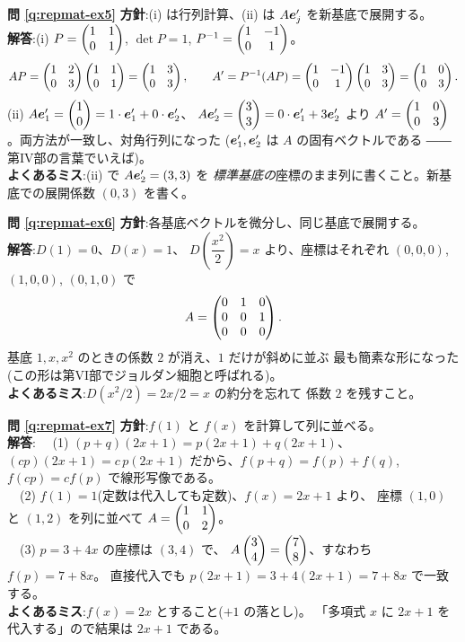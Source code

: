 \bigskip
\noindent\textbf{問 \ref{q:repmat-ex5}}\quad
\textbf{方針}:(i) は行列計算、(ii) は $A\bm{e}'_j$ を新基底で展開する。\\
\textbf{解答}:(i) $P = \begin{pmatrix}1 & 1 \\ 0 & 1\end{pmatrix}$, $\det P = 1$,
$P^{-1} = \begin{pmatrix}1 & -1 \\ 0 & 1\end{pmatrix}$。
\[
AP = \begin{pmatrix}1 & 2 \\ 0 & 3\end{pmatrix}\begin{pmatrix}1 & 1 \\ 0 & 1\end{pmatrix} = \begin{pmatrix}1 & 3 \\ 0 & 3\end{pmatrix},
\qquad
A' = P^{-1}(AP) = \begin{pmatrix}1 & -1 \\ 0 & 1\end{pmatrix}\begin{pmatrix}1 & 3 \\ 0 & 3\end{pmatrix}
= \begin{pmatrix}1 & 0 \\ 0 & 3\end{pmatrix}.
\]
(ii) $A\bm{e}'_1 = \begin{pmatrix}1 \\ 0\end{pmatrix} = 1 \cdot \bm{e}'_1 + 0 \cdot \bm{e}'_2$、
$A\bm{e}'_2 = \begin{pmatrix}3 \\ 3\end{pmatrix} = 0 \cdot \bm{e}'_1 + 3\bm{e}'_2$ より
$A' = \begin{pmatrix}1 & 0 \\ 0 & 3\end{pmatrix}$。両方法が一致し、対角行列になった
($\bm{e}'_1, \bm{e}'_2$ は $A$ の固有ベクトルである
――第IV部の言葉でいえば)。\\
\textbf{よくあるミス}:(ii) で $A\bm{e}'_2 = (3, 3)$ を
\emph{標準基底の}座標のまま列に書くこと。新基底での展開係数
$(0, 3)$ を書く。

\bigskip
\noindent\textbf{問 \ref{q:repmat-ex6}}\quad
\textbf{方針}:各基底ベクトルを微分し、同じ基底で展開する。\\
\textbf{解答}:$D(1) = 0$、$D(x) = 1$、
$D\!\left(\dfrac{x^2}{2}\right) = x$ より、座標はそれぞれ
$(0,0,0)$, $(1,0,0)$, $(0,1,0)$ で
\[
A = \begin{pmatrix}0 & 1 & 0 \\ 0 & 0 & 1 \\ 0 & 0 & 0\end{pmatrix}.
\]
基底 $1, x, x^2$ のときの係数 $2$ が消え、$1$ だけが斜めに並ぶ
最も簡素な形になった(この形は第VI部でジョルダン細胞と呼ばれる)。\\
\textbf{よくあるミス}:$D(x^2/2) = 2x/2 = x$ の約分を忘れて
係数 $2$ を残すこと。

\bigskip
\noindent\textbf{問 \ref{q:repmat-ex7}}\quad
\textbf{方針}:$f(1)$ と $f(x)$ を計算して列に並べる。\\
\textbf{解答}:
　(1) $(p + q)(2x + 1) = p(2x + 1) + q(2x + 1)$、
$(cp)(2x + 1) = c\,p(2x + 1)$ だから、$f(p + q) = f(p) + f(q)$,
$f(cp) = c f(p)$ で線形写像である。\\
　(2) $f(1) = 1$(定数は代入しても定数)、$f(x) = 2x + 1$ より、
座標 $(1, 0)$ と $(1, 2)$ を列に並べて
$A = \begin{pmatrix}1 & 1 \\ 0 & 2\end{pmatrix}$。\\
　(3) $p = 3 + 4x$ の座標は $(3, 4)$ で、
$A\begin{pmatrix}3 \\ 4\end{pmatrix} = \begin{pmatrix}7 \\ 8\end{pmatrix}$、すなわち $f(p) = 7 + 8x$。
直接代入でも $p(2x + 1) = 3 + 4(2x + 1) = 7 + 8x$ で一致する。\\
\textbf{よくあるミス}:$f(x) = 2x$ とすること($+1$ の落とし)。
「多項式 $x$ に $2x + 1$ を代入する」ので結果は $2x + 1$ である。

